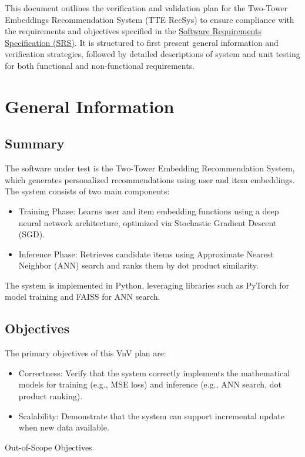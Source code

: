 \documentclass[12pt, titlepage]{article}
\begin{document}
\newpage

\nocite{*}
This document outlines the verification and validation plan for the Two-Tower Embeddings Recommendation System (TTE RecSys) to ensure compliance with the requirements and objectives specified in the \href{https://github.com/V-AS/Two-tower-recommender-system/blob/main/docs/SRS/SRS.pdf}{Software Requirements Specification (SRS)}. It is structured to first present general information and verification strategies, followed by detailed descriptions of system and unit testing for both functional and non-functional requirements.

\section{General Information}

\subsection{Summary}

The software under test is the Two-Tower Embedding Recommendation System, which generates personalized recommendations using user and item embeddings. The system consists of two main components:
\begin{itemize}
  \item Training Phase: Learns user and item embedding functions using a deep neural network architecture, optimized via Stochastic Gradient Descent (SGD).
  \item Inference Phase: Retrieves candidate items using Approximate Nearest Neighbor (ANN) search and ranks them by dot product similarity.
\end{itemize}

The system is implemented in Python, leveraging libraries such as PyTorch for model training and FAISS for ANN search.

\subsection{Objectives}
The primary objectives of this VnV plan are:
\begin{itemize}
  \item Correctness: Verify that the system correctly implements the mathematical models for training (e.g., MSE loss) and inference (e.g., ANN search, dot product ranking).
  \item Scalability: Demonstrate that the system can support incremental update when new data available.
\end{itemize}
\noindent Out-of-Scope Objectives
\end{document}
